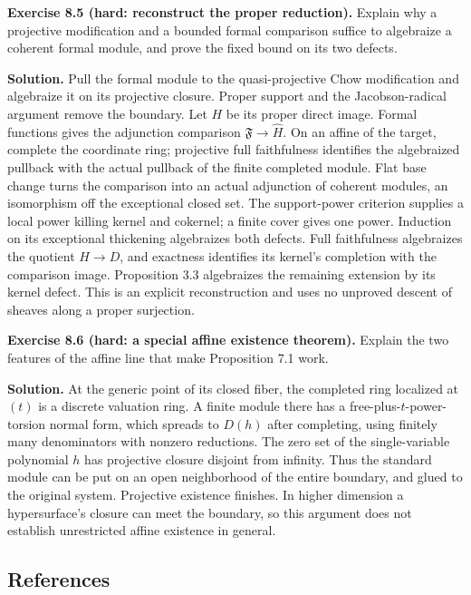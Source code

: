 \documentclass[11pt]{article}
\begin{document}
\textbf{Exercise 8.5 (hard: reconstruct the proper reduction).} Explain
why a projective modification and a bounded formal comparison suffice to
algebraize a coherent formal module, and prove the fixed bound on its
two defects.

\textbf{Solution.} Pull the formal module to the quasi-projective Chow
modification and algebraize it on its projective closure. Proper support
and the Jacobson-radical argument remove the boundary. Let \(H\) be its
proper direct image. Formal functions gives the adjunction comparison
\(\mathfrak F\to\widehat H\). On an affine of the target, complete the
coordinate ring; projective full faithfulness identifies the algebraized
pullback with the actual pullback of the finite completed module. Flat
base change turns the comparison into an actual adjunction of coherent
modules, an isomorphism off the exceptional closed set. The
support-power criterion supplies a local power killing kernel and
cokernel; a finite cover gives one power. Induction on its exceptional
thickening algebraizes both defects. Full faithfulness algebraizes the
quotient \(H\to D\), and exactness identifies its kernel's completion
with the comparison image. Proposition 3.3 algebraizes the remaining
extension by its kernel defect. This is an explicit reconstruction and
uses no unproved descent of sheaves along a proper surjection.

\textbf{Exercise 8.6 (hard: a special affine existence theorem).}
Explain the two features of the affine line that make Proposition 7.1
work.

\textbf{Solution.} At the generic point of its closed fiber, the
completed ring localized at \((t)\) is a discrete valuation ring. A
finite module there has a free-plus-\(t\)-power-torsion normal form,
which spreads to \(D(h)\) after completing, using finitely many
denominators with nonzero reductions. The zero set of the
single-variable polynomial \(h\) has projective closure disjoint from
infinity. Thus the standard module can be put on an open neighborhood of
the entire boundary, and glued to the original system. Projective
existence finishes. In higher dimension a hypersurface's closure can
meet the boundary, so this argument does not establish unrestricted
affine existence in general.

\subsection{References}\label{references-4}
\end{document}
